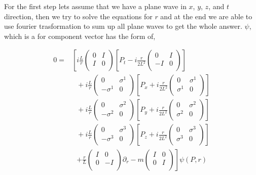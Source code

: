For the first step lets assume that we have a plane wave in $x$, $y$, $z$, and $t$ direction, then we try to solve the equations for $r$ and at the end we are able to use fourier trasformation to sum up all plane waves to get the whole answer. $\psi$, which is a for component vector has the form of,

\begin{align}
   0 =& \left[ i\frac{L}{r} \begin{pmatrix} 0 & I \\ I & 0 \\ \end{pmatrix} \left[ P_t - i\frac{r}{2L^2}\begin{pmatrix} 0 & I \\ -I & 0 \\ \end{pmatrix} \right] \right.\nonumber\\
      & ~~~ + i\frac{L}{r}\begin{pmatrix} 0 & \sigma^1 \\ -\sigma^1 & 0 \\ \end{pmatrix} \left[ P_x + i\frac{r}{2L^2}\begin{pmatrix} 0 & \sigma^1 \\ \sigma^1 & 0 \\ \end{pmatrix} \right] \nonumber\\
      & ~~~ + i\frac{L}{r}\begin{pmatrix} 0 & \sigma^2 \\ -\sigma^2 & 0 \\ \end{pmatrix} \left[ P_y + i\frac{r}{2L^2}\begin{pmatrix} 0 & \sigma^2 \\ \sigma^2 & 0 \\ \end{pmatrix} \right] \nonumber\\
      & ~~~ + i\frac{L}{r}\begin{pmatrix} 0 & \sigma^3 \\ -\sigma^3 & 0 \\ \end{pmatrix} \left[ P_z + i\frac{r}{2L^2}\begin{pmatrix} 0 & \sigma^3 \\ \sigma^3 & 0 \\ \end{pmatrix} \right] \nonumber\\
      & ~~~ \left. + \frac{r}{L}\begin{pmatrix} I & 0 \\ 0 & -I \\ \end{pmatrix} \partial_r - m \begin{pmatrix} I & 0 \\ 0 & I \\ \end{pmatrix} \right] \psi(P,r)
\end{align}

